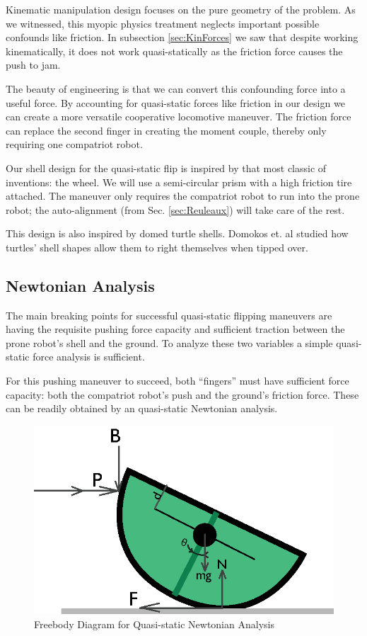 \documentclass[letterpaper, 10 pt, conference]{ieeeconf}
\begin{document}
Kinematic manipulation design focuses on the pure geometry of the problem.
As we witnessed, this myopic physics treatment neglects important possible confounds like friction.
In subsection \ref{sec:KinForces} we saw that despite working kinematically, it does not work quasi-statically as the friction force causes the push to jam.

The beauty of engineering is that we can convert this confounding force into a useful force.
By accounting for quasi-static forces like friction in our design we can create a more versatile cooperative locomotive maneuver.
The friction force can replace the second finger in creating the moment couple, thereby only requiring one compatriot robot.

Our shell design for the quasi-static flip is inspired by that most classic of inventions: the wheel.
We will use a semi-circular prism with a high friction tire attached.
The maneuver only requires the compatriot robot to run into the prone robot; the auto-alignment (from Sec. \ref{sec:Reuleaux}) will take care of the rest.

This design is also inspired by domed turtle shells. Domokos et. al \cite{domokos2008geometry} studied how turtles' shell shapes allow them to right themselves when tipped over.

\subsection{Newtonian Analysis \label{sec:QS_NewtAnalysis}}
The main breaking points for successful quasi-static flipping maneuvers are having the requisite pushing force capacity and sufficient traction between the prone robot's shell and the ground.
To analyze these two variables a simple quasi-static force analysis is sufficient.

For this pushing maneuver to succeed, both ``fingers'' must have sufficient force capacity: both the compatriot robot's push and the ground's friction force.
These can be readily obtained by an quasi-static Newtonian analysis.

\begin{figure}[ht]
\centering
\includegraphics[width=0.5\columnwidth]{QS_FreeBodyDiagram2.eps}
\caption{\label{f:QS_FBD}Freebody Diagram for Quasi-static Newtonian Analysis}
\end{figure}
\end{document}
